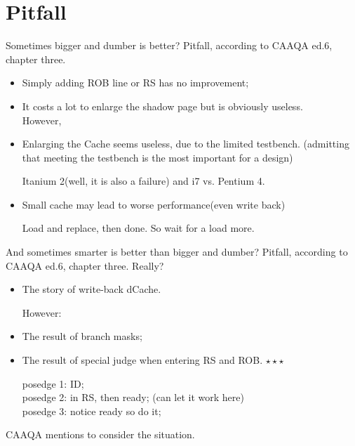 \documentclass{beamer}
\begin{document}
\section{Pitfall}
\begin{frame}{Sometimes bigger and dumber is better?}
    Pitfall, according to CAAQA ed.6, chapter three. 
    \begin{itemize}
        \item Simply adding ROB line or RS has no improvement; 
        \item It costs a lot to enlarge the shadow page but is obviously useless. 
        \\[3mm]
        However, 
        \\[3mm]
        \item Enlarging the Cache seems useless, due to the limited testbench. 
        (admitting that meeting the testbench is the most important for a design)
        
        Itanium 2(well, it is also a failure) and i7 vs. Pentium 4. 
        \item Small cache may lead to worse performance(even write back)
        
        Load and replace, then done. So wait for a load more. 
    \end{itemize}
\end{frame}

\begin{frame}{And sometimes smarter is better than bigger and dumber?}
    Pitfall, according to CAAQA ed.6, chapter three. Really? 
\begin{itemize}
    \item The story of write-back dCache. 
    
    However: 

    \item The result of branch masks; 
    \item The result of special judge when entering RS and ROB. $\star\star\star$
            
    posedge 1: ID; \\
    posedge 2: in RS, then ready; (can let it work here)\\
    posedge 3: notice ready so do it;
\end{itemize}
    CAAQA mentions to consider the situation. 
\end{frame}
\end{document}
